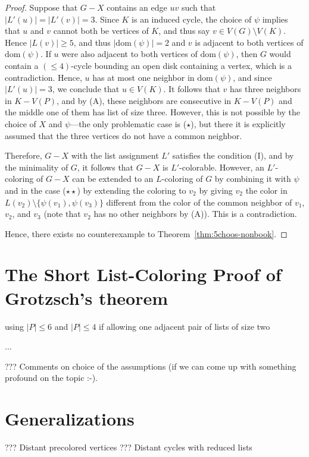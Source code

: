 \documentclass[12pt,twoside,openright,a4paper]{book}
\begin{document}
\begin{proof}
Suppose that $G-X$ contains an edge $uv$ such that $|L'(u)|=|L'(v)|=3$.  Since $K$ is an induced cycle, the choice of $\psi$
implies that $u$ and $v$ cannot both be vertices of $K$, and thus say $v\in V(G)\setminus V(K)$.  Hence $|L(v)|\ge 5$,
and thus $|\text{dom}(\psi)|=2$ and $v$ is adjacent to both vertices of $\text{dom}(\psi)$.  If $u$ were also adjacent
to both vertices of $\text{dom}(\psi)$, then $G$ would contain a $(\le\!4)$-cycle bounding an open disk containing a vertex,
which is a contradiction.  Hence, $u$ has at most one neighbor in $\text{dom}(\psi)$, and since $|L'(u)|=3$,
we conclude that $u\in V(K)$.  It follows that $v$ has three neighbors in $K-V(P)$, and by (A),
these neighbors are consecutive in $K-V(P)$ and the middle one of them has list of size three.
However, this is not possible by the choice of $X$ and $\psi$---the only problematic case is ($\star$), but
there it is explicitly assumed that the three vertices do not have a common neighbor.

Therefore, $G-X$ with the list assignment $L'$ satisfies the condition (I), and by the minimality of $G$, it
follows that $G-X$ is $L'$-colorable.  However, an $L'$-coloring of $G-X$ can be extended to an $L$-coloring of $G$
by combining it with $\psi$ and in the case ($\star\star$) by extending the coloring to $v_2$ by giving
$v_2$ the color in $L(v_2)\setminus \{\psi(v_1),\psi(v_3)\}$ different from the color of the common neighbor
of $v_1$, $v_2$, and $v_3$ (note that $v_2$ has no other neighbors by (A)).  This is a contradiction.

Hence, there exists no counterexample to Theorem~\ref{thm:5choos-nonbook}.
\end{proof}

\section{The Short List-Coloring Proof of Grotzsch's theorem}

using $|P|\le 6$ and $|P|\le 4$ if allowing one adjacent pair of lists of size two

...

??? Comments on choice of the assumptions (if we can come up with something profound on the topic :-).

\section{Generalizations}

??? Distant precolored vertices
??? Distant cycles with reduced lists
\end{document}
